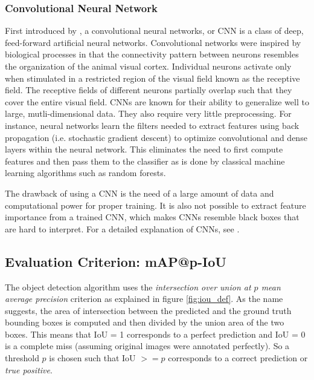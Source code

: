 		\subsubsection{Convolutional Neural Network}
			First introduced by \citet{AlexNet}, a convolutional neural networks, or CNN is a class of deep, feed-forward artificial neural networks. Convolutional networks were inspired by biological processes in that the connectivity pattern between neurons resembles the organization of the animal visual cortex. Individual neurons activate only when stimulated in a restricted region of the visual field known as the receptive field. The receptive fields of different neurons partially overlap such that they cover the entire visual field. CNNs are known for their ability to generalize well to large, mutli-dimensional data. They also require very little preprocessing. For instance, neural networks learn the filters needed to extract features using back propagation (i.e. stochastic gradient descent) to optimize convolutional and dense layers within the neural network. This eliminates the need to first compute features and then pass them to the classifier as is done by classical machine learning algorithms such as random forests.
			
			The drawback of using a CNN is the need of a large amount of data and computational power for proper training. It is also not possible to extract feature importance from a trained CNN, which makes CNNs resemble black boxes that are hard to interpret.  
			 For a detailed explanation of CNNs, see \citet{NNMethods}.
		

		\subsection{Evaluation Criterion: mAP@p-IoU}
		  The object detection algorithm uses the \textit{intersection over union at $p$ mean average precision} criterion as explained in figure \ref{fig:iou_def}. As the  name suggests, the area of intersection between the predicted and the ground truth bounding boxes is computed and then divided by the union area of the two boxes. This means that IoU = 1 corresponds to a perfect prediction and IoU = 0 is a complete miss (assuming original images were annotated perfectly). So a threshold $p$ is chosen such that IoU $>= p$ corresponds to a correct prediction or \textit{true positive}. 		  

